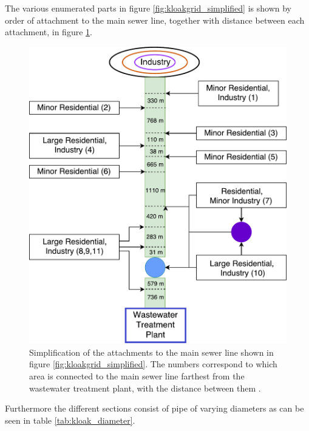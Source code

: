 The various enumerated parts in figure \ref{fig:kloakgrid_simplified} is shown by order of attachment to the main sewer line, together with distance between each attachment, in figure \ref{fig:sewer_line_diagram}. 

\begin{figure}[H]
\centering
\includegraphics[width=0.6 \textwidth]{report/system_overview/pictures/sewer_line_diagram.pdf}
\caption{Simplification of the attachments to the main sewer line shown in figure \ref{fig:kloakgrid_simplified}. The numbers correspond to which area is connected to the main sewer line farthest from the wastewater treatment plant, with the distance between them \cite{GIS_kort}.}
\label{fig:sewer_line_diagram}
\end{figure}

Furthermore the different sections consist of pipe of varying diameters as can be seen in table \ref{tab:kloak_diameter}.


